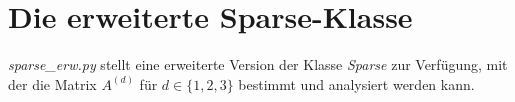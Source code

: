 \documentclass[letterpaper,10pt,ngerman, oneside, openright]{sphinxmanual}
\begin{document}
%


\chapter{Die erweiterte Sparse-Klasse}

\label{\detokenize{index:welcome-to-serie-3-s-documentation}}\label{\detokenize{index:module-sparse_erw}}\label{\detokenize{index:die-sparse-klasse}}
\textit{sparse\_erw.py} stellt eine erweiterte Version der  Klasse \textit{Sparse} zur Verfügung, mit der die Matrix $A^{(d)}$ für $d\in\{1,2,3\}$
bestimmt und analysiert werden kann.
\end{document}
